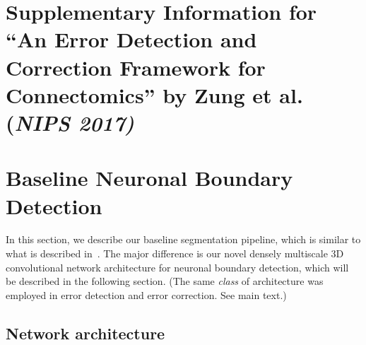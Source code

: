 \documentclass{article}
\begin{document}
\section*{Supplementary Information for ``An Error Detection and Correction Framework for Connectomics'' by Zung et al. (\textsl{NIPS 2017)}}

\appendix
\renewcommand\thefigure{S\arabic{figure}}

\section{Baseline Neuronal Boundary Detection}
\label{appendix:baseline}

In this section, we describe our baseline segmentation pipeline, which is
similar to what is described in~\cite{kisuk}. The major difference is our novel
densely multiscale 3D convolutional network architecture for neuronal boundary
detection, which will be described in the following section. (The same
\emph{class} of architecture was employed in error detection and error
correction. See main text.)

\subsection{Network architecture}
\label{sec:deltanet}
\end{document}
